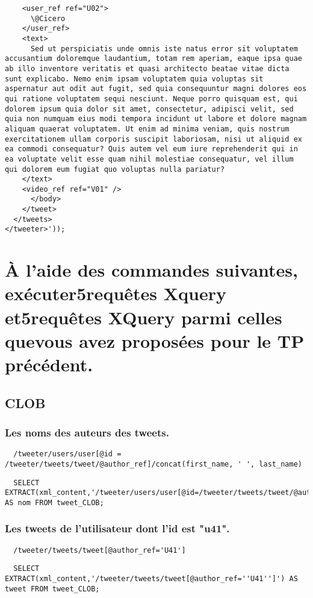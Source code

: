 \begin{verbatim}
	<user_ref ref="U02">
	  \@Cicero
	</user_ref>
	<text>
	  Sed ut perspiciatis unde omnis iste natus error sit voluptatem accusantium doloremque laudantium, totam rem aperiam, eaque ipsa quae ab illo inventore veritatis et quasi architecto beatae vitae dicta sunt explicabo. Nemo enim ipsam voluptatem quia voluptas sit aspernatur aut odit aut fugit, sed quia consequuntur magni dolores eos qui ratione voluptatem sequi nesciunt. Neque porro quisquam est, qui dolorem ipsum quia dolor sit amet, consectetur, adipisci velit, sed quia non numquam eius modi tempora incidunt ut labore et dolore magnam aliquam quaerat voluptatem. Ut enim ad minima veniam, quis nostrum exercitationem ullam corporis suscipit laboriosam, nisi ut aliquid ex ea commodi consequatur? Quis autem vel eum iure reprehenderit qui in ea voluptate velit esse quam nihil molestiae consequatur, vel illum qui dolorem eum fugiat quo voluptas nulla pariatur?
	</text>
	<video_ref ref="V01" />
      </body>
    </tweet>
  </tweets>
</tweeter>'));
\end{verbatim}

\section{À  l’aide  des  commandes  suivantes,  exécuter5requêtes  Xquery  et5requêtes  XQuery  parmi  celles  quevous avez proposées pour le TP précédent.}
\subsection{CLOB}
\subsubsection{Les noms des auteurs des tweets.}
\begin{verbatim}
  /tweeter/users/user[@id = /tweeter/tweets/tweet/@author_ref]/concat(first_name, ' ', last_name)
\end{verbatim}
\begin{verbatim}
  SELECT EXTRACT(xml_content,'/tweeter/users/user[@id=/tweeter/tweets/tweet/@author_ref]/user_name') AS nom FROM tweet_CLOB;
\end{verbatim}

\subsubsection{Les tweets de l’utilisateur dont l’id est "u41".}
\begin{verbatim}
  /tweeter/tweets/tweet[@author_ref='U41']
\end{verbatim}
\begin{verbatim}
  SELECT EXTRACT(xml_content,'/tweeter/tweets/tweet[@author_ref=''U41'']') AS tweet FROM tweet_CLOB;
\end{verbatim}

